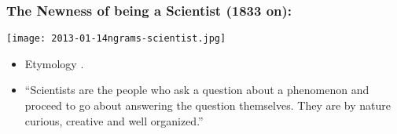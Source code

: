 \begin{frame}
  \frametitle{The Newness of being a Scientist (1833 on):}

  \texttt{[image: 2013-01-14ngrams-scientist.jpg]}

  \begin{block}{}
    \begin{itemize}
    \item<+-> 
      Etymology 
      .
    \item<+-> 
      ``Scientists are the people who ask a question about a phenomenon and proceed to  go about answering the question themselves. They are by nature curious, creative and well organized.''
    \end{itemize}
  \end{block}

  
\end{frame}





